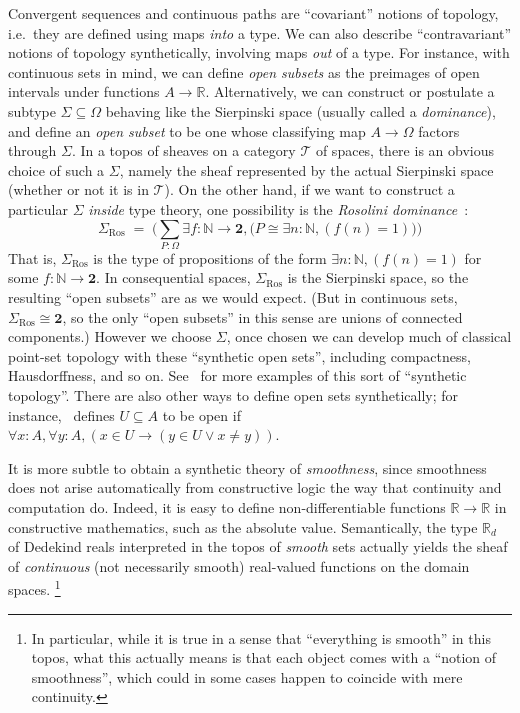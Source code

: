 \documentclass[12pt]{article}
\def\N{\mathbb{N}}
\def\R{\mathbb{R}}
\def\T{\mathcal{T}}
\def\bool{\mathbf{2}}
\numberwithin{equation}{section}
\begin{document}
Convergent sequences and continuous paths are ``covariant'' notions of topology, i.e.\ they are defined using maps \emph{into} a type.
We can also describe ``contravariant'' notions of topology synthetically, involving maps \emph{out} of a type.
For instance, with continuous sets in mind, %
we can define \emph{open subsets} as the preimages of open intervals under functions $A\to\R$.
%
Alternatively, we can construct or postulate a subtype $\Sigma\subseteq\Omega$ behaving like the Sierpinski space (usually called a \emph{dominance}), and define an \emph{open subset} to be one whose classifying map $A\to\Omega$ factors through $\Sigma$.
In a topos of sheaves on a category $\T$ of spaces, there is an obvious choice of such a $\Sigma$, namely the sheaf represented by the actual Sierpinski space (whether or not it is in $\T$).
On the other hand, if we want to construct a particular $\Sigma$ \emph{inside} type theory, one possibility is the \emph{Rosolini dominance}~\cite{rosolini:dominance}:
\[ \Sigma_{\mathrm{Ros}} \;=\; \Big(\textstyle\sum_{P:\Omega} \exists f:\N\to\bool, \Big(P \cong \exists n:\N, (f(n)=1)\Big)\Big) \]
That is, $\Sigma_{\mathrm{Ros}}$ is the type of propositions of the form $\exists n:\N, (f(n)=1)$ for some $f:\N\to\bool$.
In consequential spaces, $\Sigma_{\mathrm{Ros}}$ is the Sierpinski space, so the resulting ``open subsets'' are as we would expect.
(But in continuous sets, $\Sigma_{\mathrm{Ros}} \cong \bool$, so the only ``open subsets'' in this sense are unions of connected components.)
However we choose $\Sigma$, once chosen we can develop much of classical point-set topology with these ``synthetic open sets'', including compactness, Hausdorffness, and so on.
See~\cite{escardo:syntop-datatypes,escardo:top-hoil,taylor:lamcra,bl:met-syntop} for more examples of this sort of ``synthetic topology''.
There are also other ways to define open sets synthetically; for instance,~\cite{penon:thesis} defines $U\subseteq A$ to be open if $\forall x:A,\forall y:A, (x\in U \to (y\in U \lor x\neq y))$.

It is more subtle to obtain a synthetic theory of \emph{smoothness}, since smoothness does not arise automatically from constructive logic the way that continuity and computation do.
Indeed, it is easy to define non-differentiable functions $\R\to\R$ in constructive mathematics, such as the absolute value.
Semantically, the type $\R_d$ of Dedekind reals interpreted in the topos of \emph{smooth} sets actually yields the sheaf of \emph{continuous} (not necessarily smooth) real-valued functions on the domain spaces.%
\footnote{In particular, while it is true in a sense that ``everything is smooth'' in this topos, what this actually means is that each object comes with a ``notion of smoothness'', which could in some cases happen to coincide with mere continuity.}
\end{document}
